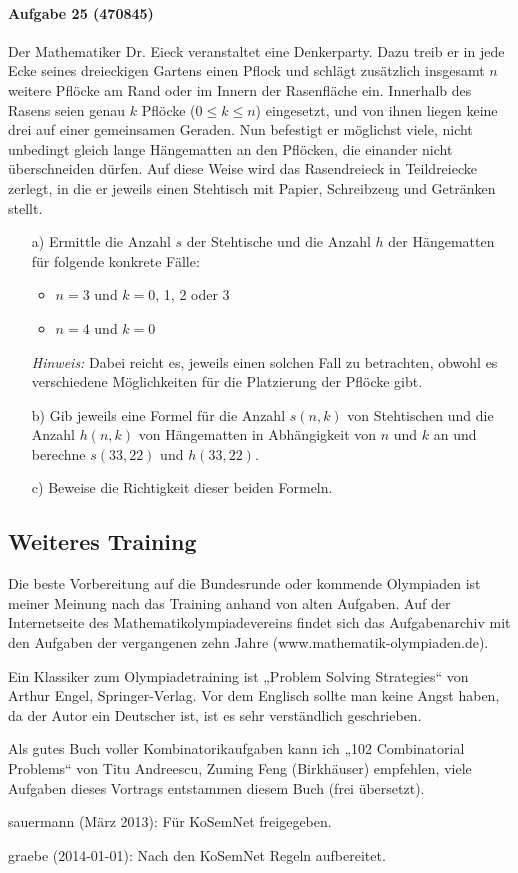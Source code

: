 \documentclass[11pt,a4paper]{article}
\begin{document}
\paragraph{Aufgabe 25 (470845)} 
Der Mathematiker Dr. Eieck veranstaltet eine Denkerparty. Dazu treib er in
jede Ecke seines dreieckigen Gartens einen Pflock und schlägt zusätzlich
insgesamt $n$ weitere Pflöcke am Rand oder im Innern der Rasenfläche ein.
Innerhalb des Rasens seien genau $k$ Pflöcke ($0\leq k\leq n$) eingesetzt, und
von ihnen liegen keine drei auf einer gemeinsamen Geraden. Nun befestigt er
möglichst viele, nicht unbedingt gleich lange Hängematten an den Pflöcken, die
einander nicht überschneiden dürfen. Auf diese Weise wird das Rasendreieck in
Teildreiecke zerlegt, in die er jeweils einen Stehtisch mit Papier,
Schreibzeug und Getränken stellt.
\begin{itemize}
\item[a)] Ermittle die Anzahl $s$ der Stehtische und die Anzahl $h$ der
  Hängematten für folgende konkrete Fälle:
  \begin{itemize}
  \item $n=3$ und $k=$0, 1, 2 oder 3 
  \item $n=4$ und $k=0$
  \end{itemize}
  \emph{Hinweis:} Dabei reicht es, jeweils einen solchen Fall zu betrachten,
  obwohl es verschiedene Möglichkeiten für die Platzierung der Pflöcke gibt.
\item[b)] Gib jeweils eine Formel für die Anzahl $s(n,k)$ von Stehtischen und
  die Anzahl $h(n,k)$ von Hängematten in Abhängigkeit von $n$ und $k$ an und
  berechne $s(33,22)$ und $h(33,22)$.
\item[c)] Beweise die Richtigkeit dieser beiden Formeln.
\end{itemize}

\subsection*{Weiteres Training}

Die beste Vorbereitung auf die Bundesrunde oder kommende Olympiaden ist meiner
Meinung nach das Training anhand von alten Aufgaben. Auf der Internetseite des
Mathematikolympiadevereins findet sich das Aufgabenarchiv mit den Aufgaben der
vergangenen zehn Jahre (www.mathematik-olympiaden.de).

Ein Klassiker zum Olympiadetraining ist „Problem Solving Strategies“ von
Arthur Engel, Springer-Verlag. Vor dem Englisch sollte man keine Angst haben,
da der Autor ein Deutscher ist, ist es sehr verständlich geschrieben.

Als gutes Buch voller Kombinatorikaufgaben kann ich „102 Combinatorial
Problems“ von Titu Andreescu, Zuming Feng (Birkhäuser) empfehlen, viele
Aufgaben dieses Vortrags entstammen diesem Buch (frei übersetzt).

\begin{attribution}
sauermann (März 2013): Für KoSemNet freigegeben.

graebe (2014-01-01): Nach den KoSemNet Regeln aufbereitet.
\end{attribution}
\end{document}
